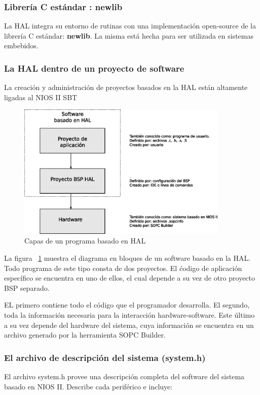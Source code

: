 \subsubsection{Librería C estándar : newlib}
La HAL integra su entorno de rutinas con una implementación open-source de la librería C estándar:\textbf{ newlib}. La misma está hecha para ser utilizada en sistemas embebidos. 

\subsubsection{La HAL dentro de un proyecto de software}
La creación y administración de proyectos basados en la HAL están altamente ligadas al NIOS II SBT

\begin{figure}[h]
  \centering
	\includegraphics[width=0.90\textwidth]{3-arquitectura/graf/halsof.eps}
  \caption{Capas de un programa basado en HAL}
  \label{fig:halsof}
\end{figure}

La figura ~\ref{fig:halsof} muestra el diagrama en bloques de un software basado en la HAL. Todo programa de este tipo consta de dos proyectos. El ćodigo de aplicación específico se encuentra en uno de ellos, el cual depende a su vez de otro proyecto BSP separado.

EL primero contiene todo el código que el programador desarrolla. El segundo, toda la información necesaria para la interacción hardware-software. Este último a su vez depende del hardware del sistema, cuya información se encuentra en un archivo generado por la herramienta SOPC Builder.

\subsubsection{El archivo de descripción del sistema (system.h)}
El archivo system.h provee una descripción completa del software del sistema basado en NIOS II. Describe cada periférico e incluye:

